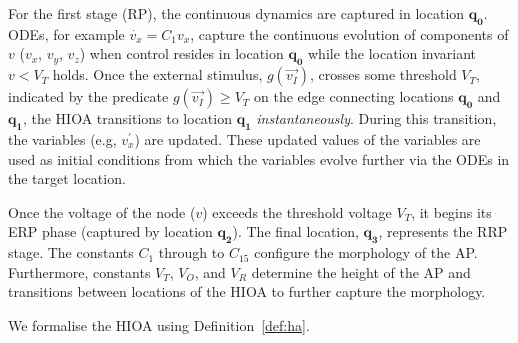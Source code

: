For the first stage (\ac{RP}), the continuous dynamics are captured in
location $\mathbf{q_0}$. \acfp{ODE}, for example \mbox{$\dot{v_{x}} = 
C_{1}v_{x}$}, capture the continuous evolution of components of $v$ ($v_{x}$, 
$v_{y}$, $v_{z}$) when control resides in location $\mathbf{q_{0}}$ 
while the location invariant $v < V_{T}$ holds.  Once the external
stimulus, $g(\vec{v_{I}})$, crosses some threshold $V_{T}$, indicated by
the predicate \mbox{$g(\vec{v_{I}}) \geq V_{T}$} on the edge connecting
locations $\mathbf{q_{0}}$ and $\mathbf{q_{1}}$, the \ac{HIOA}
transitions to location $\mathbf{q_{1}}$
\textit{instantaneously}. During this transition, the variables (e.g,
$v^{\prime}_{x}$) are updated. These updated values of the variables are
used as initial conditions from which the variables evolve further via
the \acp{ODE} in the target location.

Once the voltage of the node ($v$) exceeds the threshold voltage
$V_{T}$, it begins its \ac{ERP} phase (captured by location
$\mathbf{q_2}$). The final location, $\mathbf{q_3}$, represents the
\ac{RRP} stage. The constants $C_1$ through to $C_{15}$ configure the
morphology of the \ac{AP}. Furthermore, constants $V_T$, $V_O$, and
$V_R$ determine the height of the \ac{AP} and transitions between
locations of the \ac{HIOA} to further capture the morphology.



We formalise the \ac{HIOA} using Definition~\ref{def:ha}.

